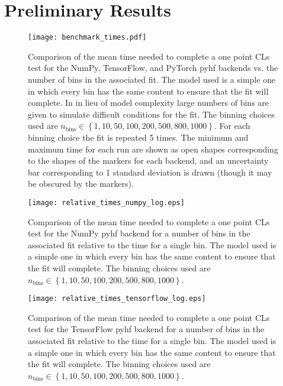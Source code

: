 \section{Preliminary Results}\label{section:results}

\begin{figure}
 \centering
 \texttt{[image: benchmark\_times.pdf]}
 \caption{Comparison of the mean time needed to complete a one point CLs test for the NumPy, TensorFlow, and PyTorch pyhf backends vs. the number of bins in the associated fit.
  The model used is a simple one in which every bin has the same content to ensure that the fit will complete.
  In in lieu of model complexity large numbers of bins are given to simulate difficult conditions for the fit.
  The binning choices used are $n_{\text{bins}} \in \left\{1, 10, 50, 100, 200, 500, 800, 1000\right\}$.
  For each binning choice the fit is repeated 5 times.
  The minimum and maximum time for each run are shown as open shapes corresponding to the shapes of the markers for each backend, and an uncertainty bar corresponding to 1 standard deviation is drawn (though it may be obscured by the markers).
 }
 \label{fig:benchmark_backends}
\end{figure}

\begin{figure}
 \centering
 \texttt{[image: relative\_times\_numpy\_log.eps]}
 \caption{Comparison of the mean time needed to complete a one point CLs test for the NumPy pyhf backend for a number of bins in the associated fit relative to the time for a single bin.
  The model used is a simple one in which every bin has the same content to ensure that the fit will complete.
  The binning choices used are $n_{\text{bins}} \in \left\{1, 10, 50, 100, 200, 500, 800, 1000\right\}$.
 }
 \label{fig:relative_time_numpy}
\end{figure}

\begin{figure}
 \centering
 \texttt{[image: relative\_times\_tensorflow\_log.eps]}
 \caption{Comparison of the mean time needed to complete a one point CLs test for the TensorFlow pyhf backend for a number of bins in the associated fit relative to the time for a single bin.
  The model used is a simple one in which every bin has the same content to ensure that the fit will complete.
  The binning choices used are $n_{\text{bins}} \in \left\{1, 10, 50, 100, 200, 500, 800, 1000\right\}$.
 }
 \label{fig:relative_time_tensorflow}
\end{figure}

